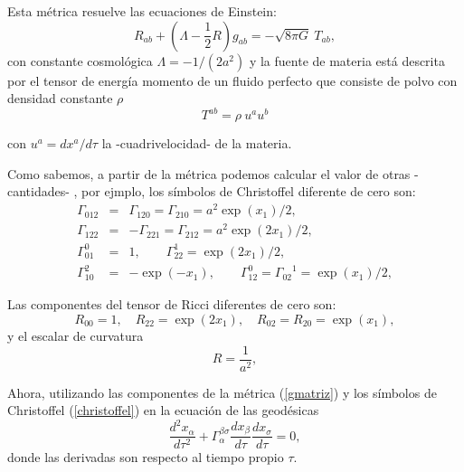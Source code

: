 \documentclass[11pt]{book}
\begin{document}
Esta métrica resuelve las ecuaciones de Einstein:
\begin{equation}
R_{ab}+(\Lambda - \frac{1}{2}R)g_{ab}=-\sqrt{8\pi G}~T_{ab},
\label{eqe}
\end{equation}
con constante cosmológica $\Lambda=-1/(2a^2)$ y la fuente de materia está descrita por el tensor de energía momento de un fluido perfecto que consiste de polvo con densidad constante $\rho$
\begin{equation}
T^{ab}=\rho~ u^a u^b
\end{equation}

con $u^a=dx^a/d\tau$ la -cuadrivelocidad- de la materia.

Como sabemos, a partir de la métrica podemos calcular el valor de otras -cantidades-%
, por ejmplo, %
 los símbolos de Christoffel diferente de cero son:
\begin{eqnarray}
 \Gamma_{012}&=&\Gamma_{120}=\Gamma_{210}= a^2 \exp(x_1)/2, \nonumber
 \\
\Gamma_{122}&=&-\Gamma_{221}=\Gamma_{212}= a^2 \exp(2x_1)/2, \nonumber
\\
\Gamma_{01}^{0} &=& 1, \qquad \Gamma_{22}^{1} = \exp(2x_1)/2, \nonumber
\\
\Gamma_{10}^{2} &=& -\exp(-x_1), \qquad
\Gamma_{12}^{0} = {\Gamma_{02}}^{1} = \exp(x_1)/2, \nonumber
\label{christoffel}
\end{eqnarray}

Las componentes del tensor de Ricci diferentes de cero son:
\begin{equation}\label{ricci}
R_{00}=1, \quad R_{22}= \exp(2x_1),\quad R_{02}=R_{20}=\exp(x_1),
\label{ricci}
\end{equation}
y el escalar de curvatura
\begin{equation}
R=\frac{1}{a^2},
\label{R}
\end{equation}

Ahora, utilizando las componentes de la métrica (\ref{gmatriz}) y los símbolos de Christoffel (\ref{christoffel}) en la ecuación de las geodésicas
\begin{equation}
\frac {d^2 x_{\alpha}}{d\tau^2} + \Gamma_{\alpha}^{\beta\sigma} \frac{dx_\beta}{d\tau} \frac{dx_\sigma}{d\tau} = 0,
\label{geodesicas}
\end{equation}
donde las derivadas son respecto al tiempo propio $\tau$.
\end{document}
